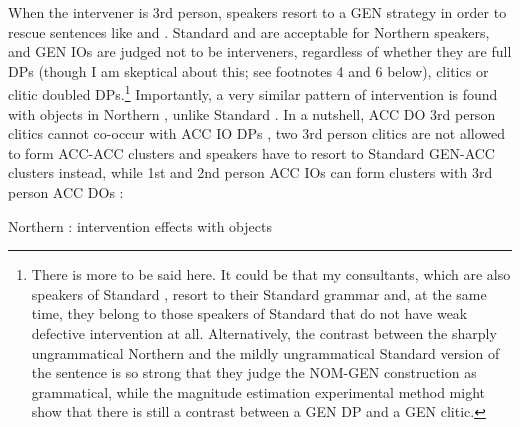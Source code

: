 \documentclass[output=paper]{LSP/langsci}
\begin{document}
When the intervener is 3rd person, speakers resort to a GEN strategy in order to rescue sentences like  and . Standard   and  are acceptable for Northern  speakers, and GEN IOs are judged not to be interveners, regardless of whether they are full DPs (though I am skeptical about this; see footnotes 4 and 6 below), clitics or clitic doubled DPs.\footnote{There is more to be said here. It could be that my consultants, which are also speakers of Standard , resort to their Standard  grammar and, at the same time, they belong to those speakers of Standard  that do not have weak defective intervention at all. Alternatively, the contrast between the sharply ungrammatical Northern  and the mildly ungrammatical Standard  version of the sentence is so strong that they judge the NOM-GEN construction as grammatical, while the magnitude estimation experimental method might show that there is still a contrast between a GEN DP and a GEN clitic.} Importantly, a very similar pattern of intervention is found with objects in Northern , unlike Standard . In a nutshell, ACC DO 3rd person clitics cannot co-occur with ACC IO DPs , two 3rd person clitics are not allowed to form ACC-ACC clusters  and speakers have to resort to Standard  GEN-ACC clusters  instead, while 1st and 2nd person ACC IOs can form clusters with 3rd person ACC DOs :



\ea%
    \label{ex:anagnost:22}
    	 Northern : intervention effects with objects  
 
 
\z
\z
\end{document}
